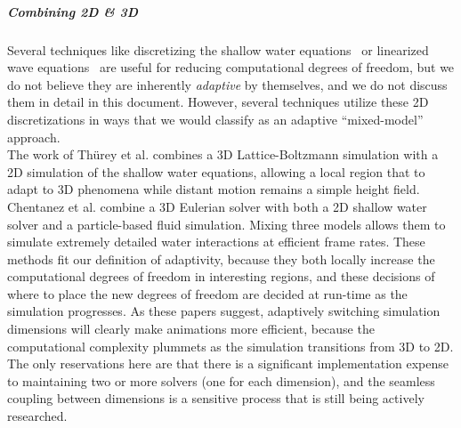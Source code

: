 \subparagraph*{Combining 2D \& 3D}
Several techniques like discretizing the shallow water equations~\cite{layton2002numerically,hagen2005visual} or linearized wave equations~\cite{kass1990rapid,tessendorf2004interactive,keeler2014ocean} are useful for reducing computational degrees of freedom, but we do not believe they are inherently {\em adaptive} by themselves, and we do not discuss them in detail in this document. However, several techniques utilize these 2D discretizations in ways that we would classify as an adaptive ``mixed-model'' approach.
\\
The work of Th\"urey et al. \cite{Thurey2006:Coupling} combines a 3D Lattice-Boltzmann simulation with a 2D simulation of the shallow water equations, allowing a local region that to adapt to 3D phenomena while distant motion remains a simple height field. Chentanez et al. \cite{Chentanez2014} combine a 3D Eulerian solver with both a 2D shallow water solver and a particle-based fluid simulation. Mixing three models allows them to simulate extremely detailed water interactions at efficient frame rates. These methods fit our definition of adaptivity, because they both locally increase the computational degrees of freedom in interesting regions, and these decisions of where to place the new degrees of freedom are decided at run-time as the simulation progresses. As these papers suggest, adaptively switching simulation dimensions will clearly make animations more efficient, because the computational complexity plummets as the simulation transitions from 3D to 2D. The only reservations here are that there is a significant implementation expense to maintaining two or more solvers (one for each dimension), and the seamless coupling between dimensions is a sensitive process that is still being actively researched.


